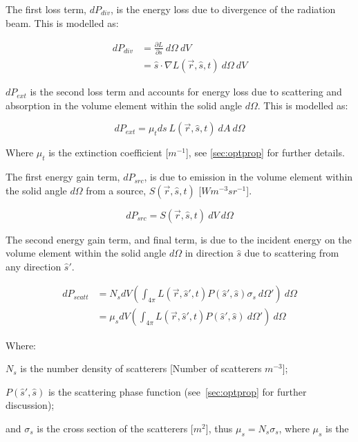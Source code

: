 The first loss term, $dP_{div}$, is the energy loss due to divergence of the radiation beam. This is modelled as:

\begin{align}
	dP_{div}&=\frac{\partial L}{\partial s}\ d\Omega\ dV \\
		    &=\hat{s} \cdot \nabla L(\vec{r},\hat{s},t)\ d\Omega\ dV
    \label{eqn:pdiv}
\end{align}

$dP_{ext}$ is the second loss term and accounts for energy loss due to scattering and absorption in the volume element within the solid angle $d\Omega$. This is modelled as:


\begin{equation}
	dP_{ext}=\mu_t ds\ L(\vec{r},\hat{s},t)\ dA\ d\Omega
	\label{eqn:pext}
\end{equation}

Where $\mu_t$ is the extinction coefficient [$m^{-1}$], see \cref{sec:optprop} for further details.

The first energy gain term, $dP_{src}$, is due to emission in the volume element within the solid angle $d\Omega$ from a source, $S(\vec{r},\hat{s},t)$ [$Wm^{-3}sr^{-1}$]. 

\begin{equation}
	dP_{src}=S(\vec{r},\hat{s},t)\ dV\ d\Omega
	\label{eqn:psrc}
\end{equation}

The second energy gain term, and final term, is due to the incident energy on the volume element within the solid angle $d\Omega$ in direction $\hat{s}$ due to scattering from any direction $\hat{s}'$.

\begin{align}
	dP_{scatt}&=N_sdV\left(\int_{4\pi}L(\vec{r},\hat{s}',t)P(\hat{s}',\hat{s})\sigma_s\ d\Omega' \right)\ d\Omega \\
			  &=\mu_sdV\left(\int_{4\pi}L(\vec{r},\hat{s}',t)P(\hat{s}',\hat{s})\ d\Omega' \right)\ d\Omega 
			  \label{eqn:pscatt}
\end{align}

\noindent Where:

\indent $N_s$ is the number density of scatterers [Number of scatterers $m^{-3}$];

\indent $P(\hat{s}',\hat{s})$ is the scattering phase function (see~\cref{sec:optprop} for further discussion);

\indent and $\sigma_s$ is the cross section of the scatterers [$m^2$], thus $\mu_s=N_s\sigma_s$, where $\mu_s$ is the 


